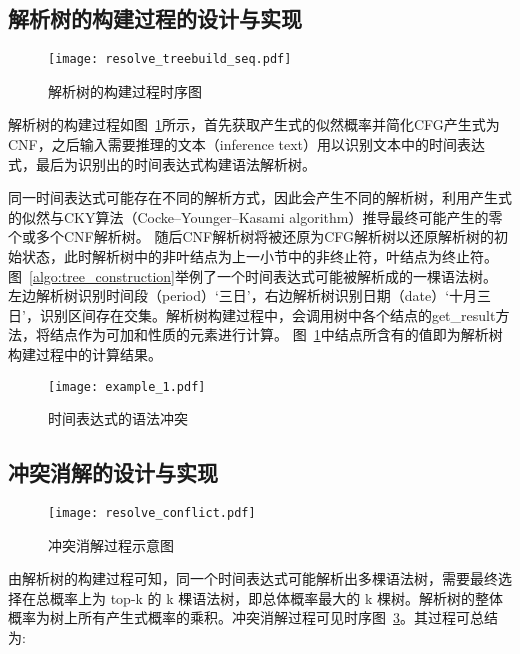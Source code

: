 \subsection{解析树的构建过程的设计与实现}

\begin{figure}[h]
    \centering
    \texttt{[image: resolve\_treebuild\_seq.pdf]}
    \caption{解析树的构建过程时序图}
    \label{fig:tree_construction}
\end{figure}

解析树的构建过程如图~\ref{fig:tree_construction}所示，首先获取产生式的似然概率并简化CFG产生式为CNF，之后输入需要推理的文本（inference text）用以识别文本中的时间表达式，最后为识别出的时间表达式构建语法解析树。

同一时间表达式可能存在不同的解析方式，因此会产生不同的解析树，利用产生式的似然与CKY算法（Cocke–Younger–Kasami algorithm）推导最终可能产生的零个或多个CNF解析树。
随后CNF解析树将被还原为CFG解析树以还原解析树的初始状态，此时解析树中的非叶结点为上一小节中的非终止符，叶结点为终止符。图~\ref{algo:tree_construction}举例了一个时间表达式可能被解析成的一棵语法树。
左边解析树识别时间段（period）‘三日’，右边解析树识别日期（date）‘十月三日’，识别区间存在交集。解析树构建过程中，会调用树中各个结点的get\_result方法，将结点作为可加和性质的元素进行计算。
图~\ref{fig:tree_construction}中结点所含有的值即为解析树构建过程中的计算结果。

\begin{figure}[t]
    \centering
    \texttt{[image: example\_1.pdf]}
    \caption{时间表达式的语法冲突}
    \label{fig:example_1}
\end{figure}

\subsection{冲突消解的设计与实现}

\begin{figure}[b]
    \centering
    \texttt{[image: resolve\_conflict.pdf]}
    \caption{冲突消解过程示意图}
    \label{fig:conflict_resolution}
\end{figure}

由解析树的构建过程可知，同一个时间表达式可能解析出多棵语法树，需要最终选择在总概率上为 top-k 的
k 棵语法树，即总体概率最大的 k 棵树。解析树的整体概率为树上所有产生式概率的乘积。冲突消解过程可见时序图~\ref{fig:conflict_resolution}。其过程可总结为: 

